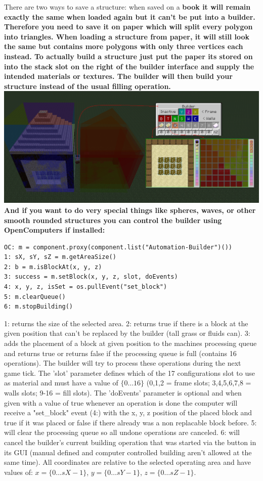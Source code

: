 \documentclass[11pt]{article} %
\begin{document}
There are two ways to save a structure: when saved on a \bf book \rm it will remain exactly the same when loaded again but it can't be put into a builder. Therefore you need to save it on \bf paper \rm which will split every polygon into triangles. When loading a structure from paper, it will still look the same but contains more polygons with only three vertices each instead. To actually build a structure just put the paper its stored on into the stack slot on the right of the builder interface and supply the intended materials or textures. The builder will then build your structure instead of the usual filling operation.\\
\includegraphics[width = \textwidth]{vertexEx}\\

And if you want to do very special things like spheres, waves, or other smooth rounded structures you can  control the builder using  OpenComputers if installed:
\begin{lstlisting}
OC: m = component.proxy(component.list("Automation-Builder")())
1: sX, sY, sZ = m.getAreaSize() 
2: b = m.isBlockAt(x, y, z) 
3: success = m.setBlock(x, y, z, slot, doEvents)
4: x, y, z, isSet = os.pullEvent("set_block")
5: m.clearQueue()
6: m.stopBuilding()
\end{lstlisting}
1: returns the size of the selected area. 2: returns true if there is a block at the given position that can't be replaced by the builder (tall grass or fluids can). 3: adds the placement of a block at given position to the machines processing queue and returns true or returns false if the processing queue is full (contains 16 operations). The builder will try to process these operations during the next game tick. The 'slot' parameter defines which of the 17 configurations slot to use as material and must have a value of $\{ 0 \dots 16 \}$ (0,1,2 = frame slots; 3,4,5,6,7,8 = walls slots; 9-16 = fill slots). The 'doEvents' parameter is optional and when given with a value of true whenever an operation is done the computer will receive a "set\_block" event (4:) with the x, y, z position of the placed block and true if it was placed or false if there already was a non replacable block before. 5: will clear the processing queue so all undone operations are canceled. 6: will cancel the builder's current building operation that was started via the button in its GUI (manual defined and computer controlled building aren't allowed at the same time). All coordinates are relative to the selected operating area and have values of: $x=\{0 \dots sX-1\}$, $y=\{0 \dots sY - 1\}$, $z=\{0 \dots sZ - 1\}$.
\end{document}
